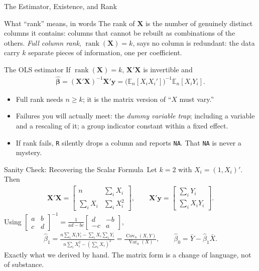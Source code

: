 \documentclass[aspectratio=169,11pt,xcolor=dvipsnames]{beamer}
\DeclareMathOperator{\Cov}{Cov}
\DeclareMathOperator{\Var}{Var}
\DeclareMathOperator{\rank}{rank}
\newcommand{\En}{\mathbb{E}_n}
\newcommand{\X}{\bm{X}}
\newcommand{\Y}{\bm{y}}
\newcommand{\bhat}{\hat{\bm{\beta}}}
\newcommand{\adv}{\,\raisebox{0.6pt}{\textcolor{accent}{$\bigstar$}}}
\begin{document}
\begin{frame}{The Estimator, Existence, and Rank}
\begin{block}{What ``rank'' means, in words}
The \alert{rank} of $\X$ is the number of genuinely distinct columns it
contains: columns that cannot be rebuilt as combinations of the others.
\emph{Full column rank}, $\rank(\X)=k$, says no column is redundant: the data
carry $k$ separate pieces of information, one per coefficient.
\end{block}
\begin{block}{The OLS estimator}
If $\rank(\X)=k$, $\X'\X$ is invertible and
\begin{align*}
  \bhat = (\X'\X)^{-1}\X'\Y = \big(\En[X_iX_i']\big)^{-1}\En[X_iY_i] .
\end{align*}
\end{block}
\begin{itemize}\itemsep2pt
  \item Full rank needs $n \geq k$; it is the matrix version of ``$X$ must
        vary.''
  \item Failures you will actually meet: the \emph{dummy variable trap}; including
        a variable and a rescaling of it; a group indicator constant within a
        fixed effect.
  \item If rank fails, \texttt{R} silently drops a column and reports \texttt{NA}.
        That \texttt{NA} is never a mystery.
\end{itemize}
\end{frame}

\begin{frame}{Sanity Check: Recovering the Scalar Formula\adv}
Let $k=2$ with $X_i = (1, X_i)'$. Then
\begin{align*}
  \X'\X = \begin{bmatrix} n & \sum_i X_i \\ \sum_i X_i & \sum_i X_i^2\end{bmatrix},
  \qquad
  \X'\Y = \begin{bmatrix} \sum_i Y_i \\ \sum_i X_i Y_i \end{bmatrix} .
\end{align*}
Using $\begin{bmatrix} a & b\\ c& d\end{bmatrix}^{-1}
= \frac{1}{ad-bc}\begin{bmatrix} d & -b\\ -c & a\end{bmatrix}$,
\begin{align*}
  \hat\beta_1 = \frac{n\sum_i X_iY_i - \sum_i X_i \sum_i Y_i}
                     {n\sum_i X_i^2 - (\sum_i X_i)^2}
  = \frac{\Cov_n(X,Y)}{\Var_n(X)},
  \qquad
  \hat\beta_0 = \bar Y - \hat\beta_1 \bar X .
\end{align*}
\vskip4pt
Exactly what we derived by hand. The matrix form is a change of language, not of
substance.
\end{frame}
\end{document}
